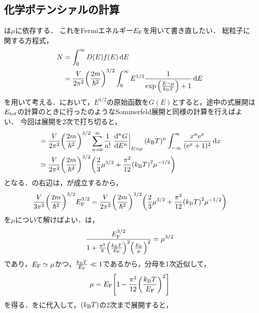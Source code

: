 \documentclass{report}
\begin{document}
      \subsection{化学ポテンシァルの計算}
        は$\mu$に依存する．
        これをFermiエネルギー$E_{\mathrm{F}}$を用いて書き直したい．
        総粒子に関する方程式，
        \begin{align}
          N &= \int_{0}^{\infty} D(E)f(E) \dd{E} \label{total-electron-3} \\ 
          &= \frac{V}{2\pi^2}\qty(\frac{2m}{\hbar^2})^{3/2} \int_{0}^{\infty} E^{1/2}\frac{1}{\exp\qty(\frac{E - \mu}{k_{\mathrm{B}} T}) + 1} \dd{E} \label{total-electron}
        \end{align}
        を用いて考える．において，$E^{1/2}$の原始函数を$G(E)$とすると，途中の式展開は$E_{\mathrm{tot}}$の計算のときに行ったのようなSommerfeld展開と同様の計算を行えばよい．
        今回は展開を2次で打ち切ると，
        \begin{align}
          &= \frac{V}{2\pi^2}\qty(\frac{2m}{\hbar^2})^{3/2} \sum_{n = 0}^{\infty}\frac{1}{n!}\left.\dv[n]{G}{E}\right|_{E = \mu} (k_{\mathrm{B}} T)^n \int_{-\infty}^{\infty}\frac{x^n\mathrm{e}^x}{(\mathrm{e}^x + 1)^2} \dd{x} \\ 
          &\simeq \frac{V}{2\pi^2}\qty(\frac{2m}{\hbar^2})^{3/2} \qty(\frac{2}{3}\mu^{3/2} + \frac{\pi^2}{12}\qty(k_{\mathrm{B}} T)^2\mu^{-1/2}) \label{total-electron-2}
        \end{align}
        となる．の右辺は，が成立するから，
        \begin{align}
          \frac{V}{3\pi^2}\qty(\frac{2m}{\hbar^2})^{3/2} E_{\mathrm{F}}^{3/2} = \frac{V}{2\pi^2}\qty(\frac{2m}{\hbar^2})^{3/2} \qty(\frac{2}{3}\mu^{3/2} + \frac{\pi^2}{12}\qty(k_{\mathrm{B}} T)^2\mu^{-1/2}) \label{total-electron-4}
        \end{align}
        を$\mu$について解けばよい．は，
        \begin{align}
          \frac{E_{\mathrm{F}}^{3/2}}{1 + \frac{\pi^2}{8}\qty(\frac{k_{\mathrm{B}} T}{E_{\mathrm{F}}})^2\qty(\frac{E_{\mathrm{F}}}{\mu})^2} = \mu^{3/2}
        \end{align}
        であり，$E_{\mathrm{F}} \simeq \mu$かつ，$\frac{k_{\mathrm{B}} T}{E_{\mathrm{F}}} \ll 1$であるから，分母を1次近似して，
        \begin{align}
          \mu = E_{\mathrm{F}}\qty[1 - \frac{\pi^2}{12}\qty(\frac{k_{\mathrm{B}} T}{E_{\mathrm{F}}})^2] \label{chemical-potential}
        \end{align}
        を得る．をに代入して，$(k_{\mathrm{B}} T)$の2次まで展開すると，
\end{document}
